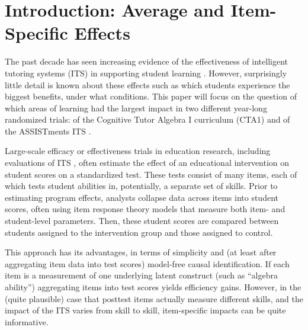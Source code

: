 \documentclass{edm_article}
\begin{document}
%


\section{Introduction: Average and Item-Specific Effects}

The past decade has seen increasing evidence of the effectiveness of
intelligent tutoring systems (ITS) in supporting student learning \cite{escueta2017education}\cite{kulik2016effectiveness}.
However, surprisingly little detail is known about these
effects such as which students experience the biggest benefits, under what conditions.
This paper will focus on the question of which areas of learning 
had the largest impact in two different year-long randomized trials: of the
Cognitive Tutor Algebra I curriculum (CTA1) \cite{pane2014effectiveness} and
of the ASSISTments ITS \cite{roschelle2016online}.

Large-scale efficacy or effectiveness trials in education research,
including evaluations of ITS
\cite{pane2014effectiveness}\cite{pane2010experiment}\cite{roschelle2016online},
often estimate the effect of an educational intervention on student
scores on a standardized test.
These tests consist of many items, each of which tests student
abilities in, potentially, a separate set of skills.
Prior to estimating program effects, analysts collapse data across
items into student scores, often using item response theory models
\cite{van2013handbook} that measure both item- and student-level
parameters. 
Then, these student scores are compared between students assigned to
the intervention group and those assigned to control.

This approach has its advantages, in terms of simplicity and (at least
after aggregating item data into test scores) model-free causal
identification. 
If each item is a measurement of one underlying latent construct (such
as ``algebra ability'') aggregating items into test scores yields
efficiency gains. 
However, in the (quite plausible) case that posttest items actually
measure different skills, and the impact of the ITS varies from skill
to skill, item-specific impacts can be quite informative.
\end{document}

